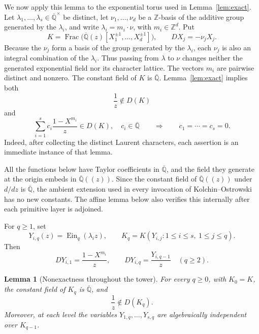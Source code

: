 \documentclass[11pt]{article}
\newtheorem{lemma}[theorem]{Lemma}
\theoremstyle{definition}
\theoremstyle{remark}
\newcommand{\Qbar}{\overline{\mathbb Q}}
\newcommand{\EinDepth}[1]{\operatorname{Ein}_{#1}}
\begin{document}
We now apply this lemma to the exponential torus used in
Lemma~\ref{lem:exact}.  Let
\(\lambda_1,\ldots,\lambda_s\in\Qbar^\times\) be distinct, let
\(\nu_1,\ldots,\nu_d\) be a \(\mathbb Z\)-basis of the additive group
generated by the \(\lambda_i\), and write
\(\lambda_i=m_i\mathbin{\cdot}\nu\), with
\(m_i\in\mathbb Z^d\).  Put
\[
 K=\operatorname{Frac}
 \bigl(\Qbar(z)[X_1^{\pm1},\ldots,X_d^{\pm1}]\bigr),
 \qquad DX_j=-\nu_jX_j.
\]
Because the \(\nu_j\) form a basis of the group generated by the
\(\lambda_i\), each \(\nu_j\) is also an integral combination of the
\(\lambda_i\).  Thus passing from \(\lambda\) to \(\nu\) changes neither
the generated exponential field nor its character lattice.  The vectors
\(m_i\) are pairwise distinct and nonzero.
The constant field of \(K\) is \(\Qbar\).  Lemma~\ref{lem:exact}
implies both
\begin{equation}\label{eq:depth-base-nonexact}
 \frac1z\notin D(K)
\end{equation}
and
\begin{equation}\label{eq:depth-first-layer-no-combination}
 \sum_{i=1}^s c_i\frac{1-X^{m_i}}z\in D(K),\quad c_i\in\Qbar
 \qquad\Longrightarrow\qquad c_1=\cdots=c_s=0.
\end{equation}
Indeed, after collecting the distinct Laurent characters, each assertion
is an immediate instance of that lemma.

All the functions below have Taylor coefficients in \(\Qbar\), and the
field they generate at the origin embeds in \(\Qbar((z))\).  Since the
constant field of \(\Qbar((z))\) under \(d/dz\) is \(\Qbar\), the ambient
extension used in every invocation of Kolchin--Ostrowski has no new
constants.  The affine lemma below also verifies this internally after each
primitive layer is adjoined.

For \(q\geq1\), set
\[
 Y_{i,q}(z)=\EinDepth{q}(\lambda_i z),
 \qquad
 K_q=K(Y_{i,j}:1\leq i\leq s,\ 1\leq j\leq q).
\]
Then
\begin{equation}\label{eq:depth-tower-derivatives}
 DY_{i,1}=\frac{1-X^{m_i}}z,
 \qquad
 DY_{i,q}=\frac{Y_{i,q-1}}z\quad(q\geq2).
\end{equation}

\begin{lemma}[Nonexactness throughout the tower]
\label{lem:depth-one-over-z-nonexact}
For every \(q\geq0\), with \(K_0=K\), the constant field of \(K_q\) is
\(\Qbar\), and
\begin{equation}\label{eq:depth-one-over-z-all-levels}
 \frac1z\notin D(K_q).
\end{equation}
Moreover, at each level the variables
\(Y_{1,q},\ldots,Y_{s,q}\) are algebraically independent over
\(K_{q-1}\).
\end{lemma}
\end{document}
